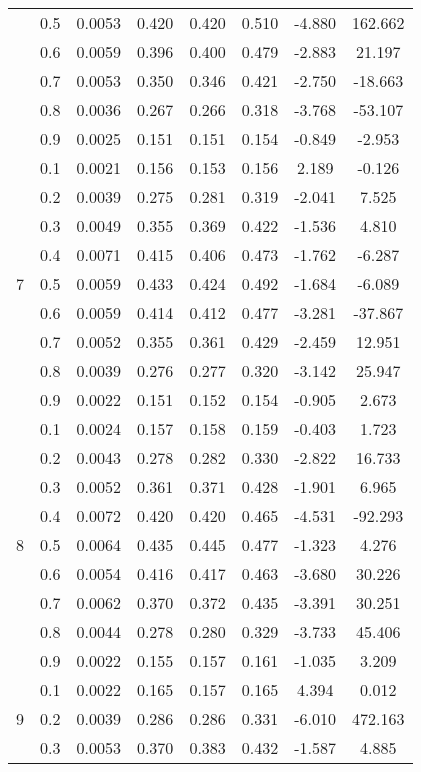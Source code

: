 \documentclass[11pt,a4paper]{report}
\begin{document}
\begin{longtable}{ | c | c || c | c | c | c | c | c | }
 & 0.5 & 0.0053 & 0.420 & 0.420 & 0.510 & -4.880 & 162.662 \\
 & 0.6 & 0.0059 & 0.396 & 0.400 & 0.479 & -2.883 & 21.197 \\
 & 0.7 & 0.0053 & 0.350 & 0.346 & 0.421 & -2.750 & -18.663 \\
 & 0.8 & 0.0036 & 0.267 & 0.266 & 0.318 & -3.768 & -53.107 \\
 & 0.9 & 0.0025 & 0.151 & 0.151 & 0.154 & -0.849 & -2.953 \\
 \hline
\multirow{9}{*}{7} & 0.1 & 0.0021 & 0.156 & 0.153 & 0.156 & 2.189 & -0.126 \\
 & 0.2 & 0.0039 & 0.275 & 0.281 & 0.319 & -2.041 & 7.525 \\
 & 0.3 & 0.0049 & 0.355 & 0.369 & 0.422 & -1.536 & 4.810 \\
 & 0.4 & 0.0071 & 0.415 & 0.406 & 0.473 & -1.762 & -6.287 \\
 & 0.5 & 0.0059 & 0.433 & 0.424 & 0.492 & -1.684 & -6.089 \\
 & 0.6 & 0.0059 & 0.414 & 0.412 & 0.477 & -3.281 & -37.867 \\
 & 0.7 & 0.0052 & 0.355 & 0.361 & 0.429 & -2.459 & 12.951 \\
 & 0.8 & 0.0039 & 0.276 & 0.277 & 0.320 & -3.142 & 25.947 \\
 & 0.9 & 0.0022 & 0.151 & 0.152 & 0.154 & -0.905 & 2.673 \\
 \hline
\multirow{9}{*}{8} & 0.1 & 0.0024 & 0.157 & 0.158 & 0.159 & -0.403 & 1.723 \\
 & 0.2 & 0.0043 & 0.278 & 0.282 & 0.330 & -2.822 & 16.733 \\
 & 0.3 & 0.0052 & 0.361 & 0.371 & 0.428 & -1.901 & 6.965 \\
 & 0.4 & 0.0072 & 0.420 & 0.420 & 0.465 & -4.531 & -92.293 \\
 & 0.5 & 0.0064 & 0.435 & 0.445 & 0.477 & -1.323 & 4.276 \\
 & 0.6 & 0.0054 & 0.416 & 0.417 & 0.463 & -3.680 & 30.226 \\
 & 0.7 & 0.0062 & 0.370 & 0.372 & 0.435 & -3.391 & 30.251 \\
 & 0.8 & 0.0044 & 0.278 & 0.280 & 0.329 & -3.733 & 45.406 \\
 & 0.9 & 0.0022 & 0.155 & 0.157 & 0.161 & -1.035 & 3.209 \\
 \hline
\multirow{9}{*}{9} & 0.1 & 0.0022 & 0.165 & 0.157 & 0.165 & 4.394 & 0.012 \\
 & 0.2 & 0.0039 & 0.286 & 0.286 & 0.331 & -6.010 & 472.163 \\
 & 0.3 & 0.0053 & 0.370 & 0.383 & 0.432 & -1.587 & 4.885 \\

\end{longtable}
\end{document}
